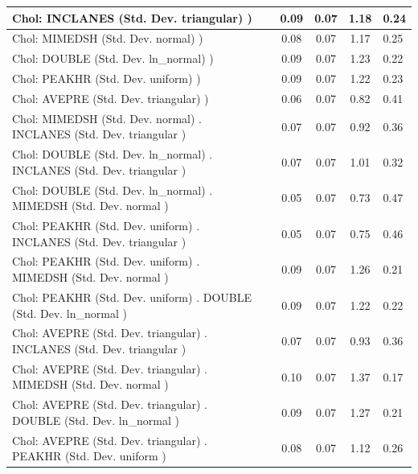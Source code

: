 \begin{table}
\begin{center}
\begin{tabular}{|l|l|c|c|c|l|}
			\hline
			 Chol: INCLANES (Std. Dev. triangular) ) &  & 0.09 & 0.07 & 1.18 & 0.24 \\
			\hline
			 Chol: MIMEDSH (Std. Dev. normal) ) &  & 0.08 & 0.07 & 1.17 & 0.25 \\
			\hline
			 Chol: DOUBLE (Std. Dev. ln_normal) ) &  & 0.09 & 0.07 & 1.23 & 0.22 \\
			\hline
			 Chol: PEAKHR (Std. Dev. uniform) ) &  & 0.09 & 0.07 & 1.22 & 0.23 \\
			\hline
			 Chol: AVEPRE (Std. Dev. triangular) ) &  & 0.06 & 0.07 & 0.82 & 0.41 \\
			\hline
			 Chol: MIMEDSH (Std. Dev. normal) . INCLANES (Std. Dev.   triangular ) &  & 0.07 & 0.07 & 0.92 & 0.36 \\
			\hline
			 Chol: DOUBLE (Std. Dev. ln_normal) . INCLANES (Std. Dev.   triangular ) &  & 0.07 & 0.07 & 1.01 & 0.32 \\
			\hline
			 Chol: DOUBLE (Std. Dev. ln_normal) . MIMEDSH (Std. Dev.   normal ) &  & 0.05 & 0.07 & 0.73 & 0.47 \\
			\hline
			 Chol: PEAKHR (Std. Dev. uniform) . INCLANES (Std. Dev.   triangular ) &  & 0.05 & 0.07 & 0.75 & 0.46 \\
			\hline
			 Chol: PEAKHR (Std. Dev. uniform) . MIMEDSH (Std. Dev.   normal ) &  & 0.09 & 0.07 & 1.26 & 0.21 \\
			\hline
			 Chol: PEAKHR (Std. Dev. uniform) . DOUBLE (Std. Dev.   ln_normal ) &  & 0.09 & 0.07 & 1.22 & 0.22 \\
			\hline
			 Chol: AVEPRE (Std. Dev. triangular) . INCLANES (Std. Dev.   triangular ) &  & 0.07 & 0.07 & 0.93 & 0.36 \\
			\hline
			 Chol: AVEPRE (Std. Dev. triangular) . MIMEDSH (Std. Dev.   normal ) &  & 0.10 & 0.07 & 1.37 & 0.17 \\
			\hline
			 Chol: AVEPRE (Std. Dev. triangular) . DOUBLE (Std. Dev.   ln_normal ) &  & 0.09 & 0.07 & 1.27 & 0.21 \\
			\hline
			 Chol: AVEPRE (Std. Dev. triangular) . PEAKHR (Std. Dev.   uniform ) &  & 0.08 & 0.07 & 1.12 & 0.26 \\
			\hline
		\end{tabular}
	\end{center}
\end{table}